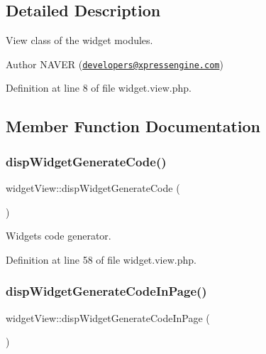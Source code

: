 \subsection{Detailed Description}
View class of the widget modules. 

\begin{DoxyAuthor}{Author}
N\+A\+V\+ER (\href{mailto:developers@xpressengine.com}{\tt developers@xpressengine.\+com}) 
\end{DoxyAuthor}


Definition at line 8 of file widget.\+view.\+php.



\subsection{Member Function Documentation}
\mbox{\label{classwidgetView_af0e573b3b57857bc0941237399e21b19}} 
\subsubsection{\texorpdfstring{disp\+Widget\+Generate\+Code()}{dispWidgetGenerateCode()}}
{\footnotesize\ttfamily widget\+View\+::disp\+Widget\+Generate\+Code (\begin{DoxyParamCaption}{ }\end{DoxyParamCaption})}



Widget\textquotesingle{}s code generator. 



Definition at line 58 of file widget.\+view.\+php.

\mbox{\label{classwidgetView_a0600670ca5dac17d9549bacecd90c3cf}} 
\subsubsection{\texorpdfstring{disp\+Widget\+Generate\+Code\+In\+Page()}{dispWidgetGenerateCodeInPage()}}
{\footnotesize\ttfamily widget\+View\+::disp\+Widget\+Generate\+Code\+In\+Page (\begin{DoxyParamCaption}{ }\end{DoxyParamCaption})}



